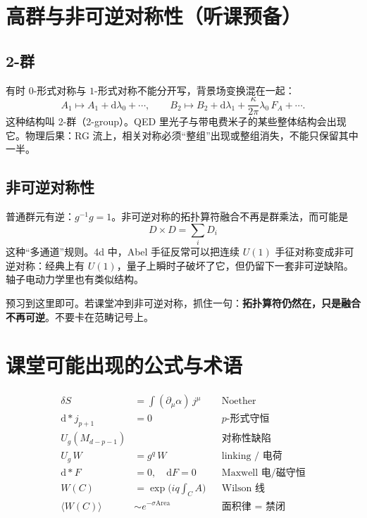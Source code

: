 \documentclass[11pt,a4paper]{article}
\theoremstyle{definition}
\theoremstyle{plain}
\theoremstyle{remark}
\newcommand{\dd}{\mathrm{d}}
\begin{document}
\section{高群与非可逆对称性（听课预备）}
\label{sec:beyond}

\subsection{2-群}

有时 $0$-形式对称与 $1$-形式对称不能分开写，背景场变换混在一起：
\begin{equation}
  A_1\mapsto A_1+\dd\lambda_0+\cdots,\qquad
  B_2\mapsto B_2+\dd\lambda_1+\frac{\kappa}{2\pi}\lambda_0\,F_{A}+\cdots.
\end{equation}
这种结构叫 2-群（2-group）。QED 里光子与带电费米子的某些整体结构会出现它。物理后果：RG 流上，相关对称必须``整组''出现或整组消失，不能只保留其中一半。

\subsection{非可逆对称性}

普通群元有逆：$g^{-1}g=1$。非可逆对称的拓扑算符融合不再是群乘法，而可能是
\begin{equation}
  D\times D=\sum_i D_i
\end{equation}
这种``多通道''规则。4d 中，Abel 手征反常可以把连续 $U(1)$ 手征对称变成非可逆对称：经典上有 $U(1)$，量子上瞬时子破坏了它，但仍留下一套非可逆缺陷。轴子电动力学里也有类似结构。

\begin{keybox}
预习到这里即可。若课堂冲到非可逆对称，抓住一句：\textbf{拓扑算符仍然在，只是融合不再可逆}。不要卡在范畴记号上。
\end{keybox}

\section{课堂可能出现的公式与术语}
\label{sec:classroom}

\begin{align}
  \delta S&=\int (\partial_\mu\alpha)\,j^\mu
  && \text{Noether}\\
  \dd{*}j_{p+1}&=0
  && \text{$p$-形式守恒}\\
  U_g(M_{d-p-1})
  &&& \text{对称性缺陷}\\
  U_g\,W&=g^q\,W
  && \text{linking / 电荷}\\
  \dd{*}F&=0,\quad \dd F=0
  && \text{Maxwell 电/磁守恒}\\
  W(C)&=\exp\bigl(iq\textstyle\int_C A\bigr)
  && \text{Wilson 线}\\
  \langle W(C)\rangle&\sim e^{-\sigma\mathrm{Area}}
  && \text{面积律 = 禁闭}
\end{align}
\end{document}
